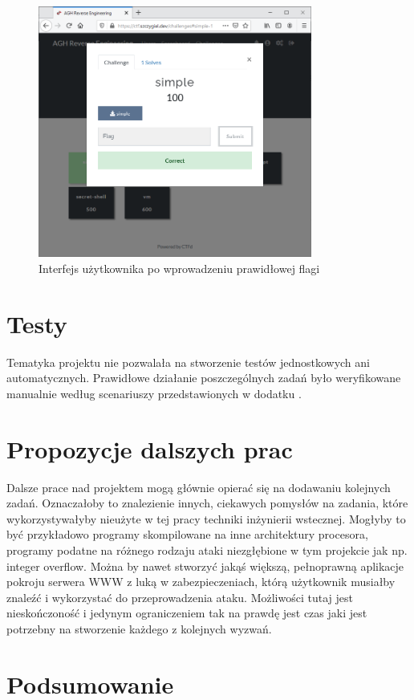 \documentclass[language=polish,type=eng]{aghmodern}
\begin{document}
\begin{figure}[H]
\centering
\includegraphics[width=9cm]{ui_solved}
\caption{Interfejs użytkownika po wprowadzeniu prawidłowej flagi}
\end{figure}

\section{Testy}

Tematyka projektu nie pozwalała na stworzenie testów jednostkowych ani automatycznych.
Prawidłowe działanie poszczególnych zadań było weryfikowane manualnie według scenariuszy
przedstawionych w dodatku .

\section{Propozycje dalszych prac}

Dalsze prace nad projektem mogą głównie opierać się na dodawaniu kolejnych zadań.
Oznaczałoby to znalezienie innych, ciekawych pomysłów na zadania, które
wykorzystywałyby nieużyte w tej pracy techniki inżynierii wstecznej.
Mogłyby to być przykładowo programy skompilowane na inne architektury procesora,
programy podatne na różnego rodzaju ataki niezgłębione w tym projekcie
jak np. integer overflow. Można by nawet stworzyć jakąś większą, pełnoprawną
aplikacje pokroju serwera WWW z luką w zabezpieczeniach, którą użytkownik musiałby znaleźć
i wykorzystać do przeprowadzenia ataku.
Możliwości tutaj jest nieskończoność i jedynym ograniczeniem tak na prawdę jest czas
jaki jest potrzebny na stworzenie każdego z kolejnych wyzwań.

\section{Podsumowanie}
\end{document}
